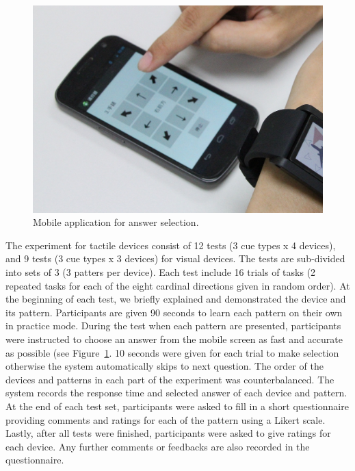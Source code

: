 \documentclass{sigchi}
\begin{document}
\begin{figure}[!t]
\centering
\includegraphics[width=0.9\columnwidth]{MobilePhone2}
\caption{Mobile application for answer selection.}
\label{fig:mobilephone}
\end{figure}

The experiment for tactile devices consist of 12 tests (3 cue types x 4 devices), and 9 tests (3 cue types x 3 devices) for visual devices. The tests are sub-divided into sets of 3 (3 patters per device). Each test include 16 trials of tasks (2 repeated tasks for each of the eight cardinal directions given in random order). At the beginning of each test, we briefly explained and demonstrated the device and its pattern. Participants are given 90 seconds to learn each pattern on their own in practice mode. During the test when each pattern are presented, participants were instructed to choose an answer from the mobile screen as fast and accurate as possible (see Figure~\ref{fig:mobilephone}. 10 seconds were given for each trial to make selection otherwise the system automatically skips to next question. The order of the devices and patterns in each part of the experiment was counterbalanced. The system records the response time and selected answer of each device and pattern. At the end of each test set, participants were asked to fill in a short questionnaire providing comments and ratings for each of the pattern using a Likert scale. Lastly, after all tests were finished, participants were asked to give ratings for each device. Any further comments or feedbacks are also recorded in the questionnaire.
\end{document}

